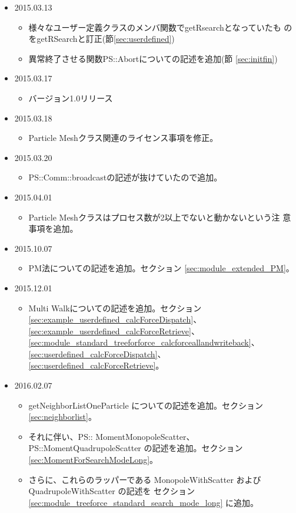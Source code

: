 \begin{itemize}
\item 2015.03.13
  \begin{itemize}
  \item 様々なユーザー定義クラスのメンバ関数でgetRsearchとなっていたも
    のをgetRSearchと訂正(節\ref{sec:userdefined})
  \item 異常終了させる関数PS::Abortについての記述を追加(節
    \ref{sec:initfin})
  \end{itemize}
\item 2015.03.17
  \begin{itemize}
  \item バージョン1.0リリース
  \end{itemize}
\item 2015.03.18
  \begin{itemize}
  \item Particle Meshクラス関連のライセンス事項を修正。
  \end{itemize}
\item 2015.03.20
  \begin{itemize}
  \item PS::Comm::broadcastの記述が抜けていたので追加。
  \end{itemize}
\item 2015.04.01
  \begin{itemize}
  \item Particle Meshクラスはプロセス数が2以上でないと動かないという注
    意事項を追加。
  \end{itemize}
  \item 2015.10.07
  \begin{itemize}
  \item PM法についての記述を追加。セクション
    \ref{sec:module_extended_PM}。
  \end{itemize}
\item 2015.12.01
  \begin{itemize}
  \item Multi Walkについての記述を追加。セクション
    \ref{sec:example_userdefined_calcForceDispatch}、
    \ref{sec:example_userdefined_calcForceRetrieve}、
    \ref{sec:module_standard_treeforforce_calcforceallandwriteback}、
    \ref{sec:userdefined_calcForceDispatch}、
    \ref{sec:userdefined_calcForceRetrieve}。
  \end{itemize}
\item 2016.02.07
  \begin{itemize}
  \item getNeighborListOneParticle についての記述を追加。セクション
    \ref{sec:neighborlist}。
\item それに伴い、PS:: MomentMonopoleScatter、PS::MomentQuadrupoleScatter 
  の記述を追加。セクション \ref{sec:MomentForSearchModeLong}。
\item さらに、これらのラッパーである MonopoleWithScatter および
  QuadrupoleWithScatter の記述を
  セクション \ref{sec:module_treeforce_standard_search_mode_long} に追加。
  \end{itemize}


\end{itemize}
